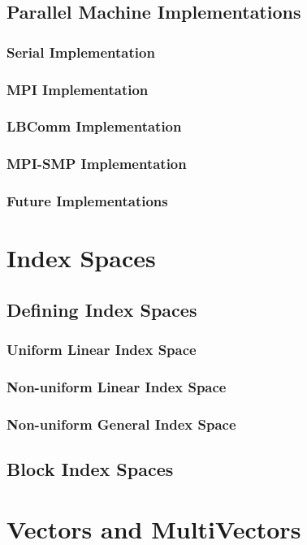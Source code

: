 \documentclass[12pt,relax]{PetraObjectModel}
\begin{document}
\subsection{Parallel Machine Implementations}
\subsubsection{Serial Implementation}
\subsubsection{MPI Implementation}
\subsubsection{LBComm Implementation}
\subsubsection{MPI-SMP Implementation}
\subsubsection{Future Implementations}


\section{Index Spaces}
\subsection{Defining Index Spaces}
\subsubsection{Uniform Linear Index Space}
\subsubsection{Non-uniform Linear Index Space}
\subsubsection{Non-uniform General Index Space}
\subsection{Block Index Spaces}

\section{Vectors and MultiVectors}
\end{document}
